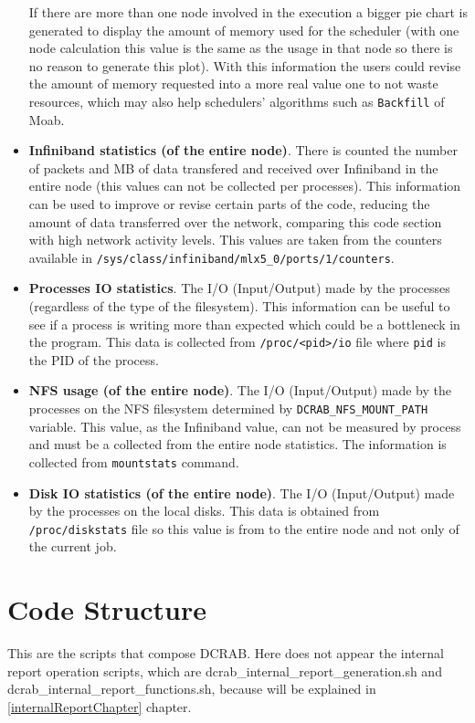 \documentclass[10pt,a4paper]{report}
\begin{document}
\begin{itemize}
	If there are more than one node involved in the execution a bigger pie chart is generated to display the amount of memory used for the scheduler (with one node calculation this value is the same as the usage in that node so there is no reason to generate this plot). With this information the users could revise the amount of memory requested into a more real value one to not waste resources, which may also help schedulers' algorithms such as \verb+Backfill+ of Moab.
	\item \textbf{Infiniband statistics (of the entire node)}. There is counted the number of packets and MB of data transfered and received over Infiniband in the entire node (this values can not be collected per processes). This information can be used to improve or revise certain parts of the code, reducing the amount of data transferred over the network, comparing this code section with high network activity levels. This values are taken from the counters available in \verb+/sys/class/infiniband/mlx5_0/ports/1/counters+.
	\item \textbf{Processes IO statistics}. The I/O (Input/Output) made by the processes (regardless of the type of the filesystem). This information can be useful to see if a process is writing more than expected which could be a bottleneck in the program. This data is collected from \verb+/proc/<pid>/io+ file where \verb+pid+ is the PID of the process.
	\item \textbf{NFS usage (of the entire node)}. The I/O (Input/Output) made by the processes on the NFS filesystem determined by \verb+DCRAB_NFS_MOUNT_PATH+ variable. This value, as the Infiniband value, can not be measured by process and must be a collected from the entire node statistics. The information is collected from \verb+mountstats+ command.
	\item \textbf{Disk IO statistics (of the entire node)}. The I/O (Input/Output) made by the processes on the local disks. This data is obtained from \verb+/proc/diskstats+ file so this value is from to the entire node and not only of the current job.
\end{itemize}

\section{Code Structure}

This are the scripts that compose DCRAB. Here does not appear the internal report operation scripts, which are dcrab\_internal\_report\_generation.sh and dcrab\_internal\_report\_functions.sh, because will be explained in \ref{internalReportChapter} chapter.
\end{document}
